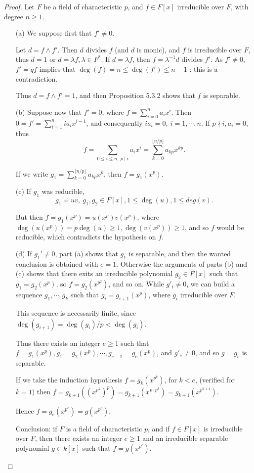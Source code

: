 \documentclass[11pt,a4paper]{article}
\begin{document}
\begin{proof}
Let $F$ be a field of characteristic $p$, and $f \in F[x]$ irreducible over $F$, with degree $n\geq 1$.
\begin{enumerate}
\item[(a)]
We suppose first that $f'\neq 0$.

Let $d = f\wedge f'$. Then $d$ divides  $f$ (and $d$ is monic), and $f$ is irreducible over $F$, thus $d=1$ or $d = \lambda f,\lambda \in F^*$.
If $d = \lambda f$, then $f =\lambda^{-1} d$ divides $f'$. As $f' \neq 0$, $f' = qf$ implies that $\deg(f) = n \leq \deg(f') \leq n-1$ : this is a contradiction.

Thus $d= f\wedge f' = 1$, and then Proposition 5.3.2 shows that $f$ is separable.

\item[(b)]
Suppose now that $f'=0$, where $f = \sum\limits_{i=0}^n a_i x^i$.
Then $0 = f' = \sum\limits_{i=1}^{n} ia_{i} x^{i-1}$, and consequently $ia_i = 0, \ i=1,\cdots,n$. If $p\nmid i, a_i = 0$, thus 
$$f = \sum\limits_{0\leq i \leq n,\ p\mid i} a_i x^i = \sum\limits_{k=0}^{\lfloor n/p \rfloor} a_{kp} x^{kp}.$$

If we write $g_1 = \sum\limits_{k=0}^{\lfloor n/p \rfloor} a_{kp} x^{k}$, then $f = g_1(x^p)$.

\item[(c)]
If $g_1$ was reducible, $$g_1 = u v,\ g_1,g_2 \in F[x], 1\leq \deg(u), 1\leq deg(v) .$$

But then $f = g_1(x^p) = u(x^p)v(x^p)$, where $\deg(u(x^p)) = p \deg(u) \geq 1, \deg(v(x^p)) \geq 1$, and so  $f$ would be reducible, which contradicts the hypothesis on $f$.

\item[(d)]
If $g_1'\neq 0$, part (a) shows that $g_1$ is separable, and then the wanted conclusion is obtained with $e=1$.
Otherwise the arguments of parts (b) and (c) shows that there exits an irreducible polynomial $g_2 \in F[x]$ such that $g_1 = g_2(x^p)$, so $f = g_2(x^{p^2})$, and so on. While $g'_i \neq 0$, we can build a sequence $g_1,\cdots,g_k$ such that $g_i = g_{i+1}(x^p)$, where $g_i$ irreducible over $F$.

This sequence is necessarily finite, since $\deg(g_{i+1}) = \deg(g_i)/p < \deg(g_i)$. 

Thus there exists an integer $e \geq 1$ such that $f = g_1(x^p), g_1 = g_2(x^p), \cdots, g_{e-1} = g_{e}(x^p)$, and $g'_{e} \ne 0$, and so $g = g_e$ is separable.

If we take the induction hypothesis $f = g_k(x^{p^k})$, for $k<e$, (verified for $k=1$) then $f = g_{k+1}((x^{p^k})^p) =  g_{k+1}(x^{p \cdot p^k}) = g_{k+1}(x^{p^{k+1}})$.

Hence $f = g_{e}(x^{p^{e}}) = g(x^{p^e})$.

Conclusion:  if $F$ is a field of characteristic $p$, and if $f \in F[x]$ is irreducible over $F$, then there exists an integer $e\geq 1$ and an irreducible separable polynomial $g \in k[x]$ such that $f = g(x^{p^e})$.
\end{enumerate}
\end{proof}
\end{document}
